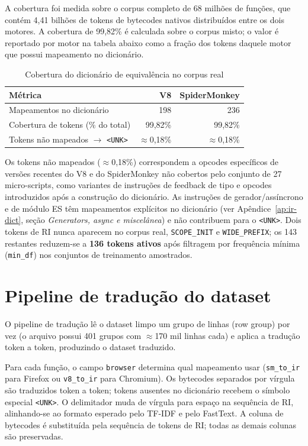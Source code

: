A cobertura foi medida sobre o corpus completo de 68 milhões de funções,
que contém 4,41 bilhões de tokens de bytecodes nativos distribuídos entre os
dois motores. A cobertura de 99,82\% é calculada sobre o corpus misto; o valor
é reportado por motor na tabela abaixo como a fração dos tokens daquele motor
que possui mapeamento no dicionário.

\begin{table}[htb]
\centering
\caption{Cobertura do dicionário de equivalência no corpus real}
\label{tab:cobertura}
\begin{tabular}{lrr}
\toprule
\textbf{Métrica} & \textbf{V8} & \textbf{SpiderMonkey} \\
\midrule
Mapeamentos no dicionário           & 198    & 236    \\
Cobertura de tokens (\% do total)   & 99,82\% & 99,82\% \\
Tokens não mapeados $\to$ \texttt{<UNK>} & $\approx$0,18\% & $\approx$0,18\% \\
\bottomrule
\end{tabular}
\end{table}

Os tokens não mapeados ($\approx$0,18\%) correspondem a opcodes específicos de
versões recentes do V8 e do SpiderMonkey não cobertos pelo conjunto de 27
micro-scripts, como variantes de instruções de feedback de tipo e opcodes
introduzidos após a construção do dicionário. As instruções de gerador/assíncrono e
de módulo ES têm mapeamentos explícitos no dicionário (ver Apêndice~\ref{ap:ir-dict},
seção \textit{Generators, async e miscelânea}) e não contribuem para o
\texttt{<UNK>}. Dois tokens de RI nunca aparecem no corpus real, \texttt{SCOPE\_INIT} e \texttt{WIDE\_PREFIX};
os 143 restantes reduzem-se a \textbf{136 tokens ativos} após filtragem por frequência
mínima (\texttt{min\_df}) nos conjuntos de treinamento amostrados.

\section{Pipeline de tradução do dataset}
\label{sec:traducao}

O pipeline de tradução lê o dataset limpo um grupo de linhas (row group) por
vez (o arquivo possui 401 grupos com $\approx$170 mil linhas cada) e
aplica a tradução token a token, produzindo o dataset traduzido.

Para cada função, o campo \texttt{browser} determina qual mapeamento usar
(\texttt{sm\_to\_ir} para Firefox ou \texttt{v8\_to\_ir} para Chromium). Os
bytecodes separados por vírgula são traduzidos token a token; tokens ausentes no
dicionário recebem o símbolo especial \texttt{<UNK>}. O delimitador muda de
vírgula para espaço na sequência de RI, alinhando-se ao formato esperado pelo
TF-IDF e pelo FastText. A coluna de bytecodes é substituída pela sequência de
tokens de RI; todas as demais colunas são preservadas.


